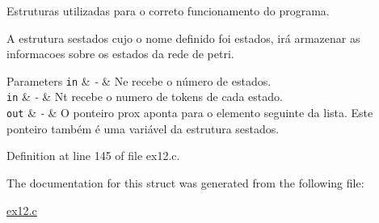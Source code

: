 \begin{DoxyItemize}
\item Estruturas utilizadas para o correto funcionamento do programa. 
\end{DoxyItemize}


\begin{DoxyItemize}
\item A estrutura sestados cujo o nome definido foi estados, irá armazenar as informacoes sobre os estados da rede de petri. 
\begin{DoxyParams}[1]{Parameters}
\mbox{\tt in}  & {\em -\/} & Ne recebe o número de estados. \\
\hline
\mbox{\tt in}  & {\em -\/} & Nt recebe o numero de tokens de cada estado. \\
\hline
\mbox{\tt out}  & {\em -\/} & O ponteiro prox aponta para o elemento seguinte da lista. Este ponteiro também é uma variável da estrutura sestados. \\
\hline
\end{DoxyParams}

\end{DoxyItemize}

Definition at line 145 of file ex12.\+c.



The documentation for this struct was generated from the following file\+:\begin{DoxyCompactItemize}
\item 
\hyperlink{ex12_8c}{ex12.\+c}\end{DoxyCompactItemize}
